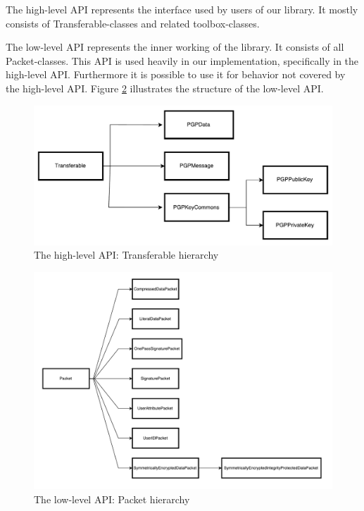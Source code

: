 The high-level API represents the interface used by users of our library. It mostly consists of Transferable-classes and related toolbox-classes.

The low-level API represents the inner working of the library. It consists of all Packet-classes. This API is used heavily in our implementation, specifically in the high-level API. Furthermore it is possible to use it for behavior not covered by the high-level API. Figure \ref{fig:packethierarchy} illustrates the structure of the low-level API.

\begin{figure}[p]
	\centering
	\includegraphics[width=1\linewidth]{figures/TransferableHierarchy.pdf}
	\caption[]{The high-level API: Transferable hierarchy }
	\label{fig:transferablehierarchy}
\end{figure}

\begin{figure}[p]
	\centering
	\includegraphics[width=1\linewidth]{figures/PacketHierarchy.pdf}
	\caption[]{The low-level API: Packet hierarchy }
	\label{fig:packethierarchy}
\end{figure}

